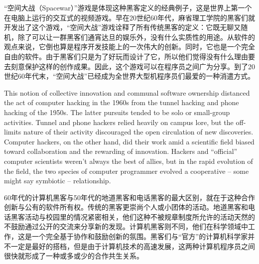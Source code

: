 \ifdefined\chs
“空间大战（Spacewar）”游戏是体现这种黑客定义的经典例子，这是世界上第一个在电脑上运行的交互式的视频游戏。早在20世纪60年代，麻省理工学院的黑客们就开发出了这个游戏，“空间大战”游戏诠释了所有传统黑客的定义：它既无聊又随机，除了可以让一群黑客们通宵达旦的娱乐外，没有什么实质性的用途。从软件的观点来说，它倒也算是程序开发技能上的一次伟大的创新。同时，它也是一个完全自由的软件。由于黑客们只是为了好玩而设计了它，所以他们觉得没有什么理由要去刻意保护这样的创作成果。因此，这个游戏可以在程序员之间广为分享。到了20世纪60年代末，“空间大战”已经成为全世界大型机程序员们最爱的一种消遣方式。
\fi

\ifdefined\eng
This notion of collective innovation and communal software ownership distanced the act of computer hacking in the 1960s from the tunnel hacking and phone hacking of the 1950s. The latter pursuits tended to be solo or small-group activities. Tunnel and phone hackers relied heavily on campus lore, but the off-limits nature of their activity discouraged the open circulation of new discoveries. Computer hackers, on the other hand, did their work amid a scientific field biased toward collaboration and the rewarding of innovation. Hackers and ``official'' computer scientists weren't always the best of allies, but in the rapid evolution of the field, the two species of computer programmer evolved a cooperative -- some might say symbiotic -- relationship.
\fi

\ifdefined\chs
60年代的计算机黑客与50年代的地道黑客和电话黑客的最大区别，就在于这种合作创新与公有的软件所有权。传统的黑客更崇尚个人或小团体的活动。地道黑客和电话黑客活动与校园里的情况紧密相关，他们这种不被规章制度所允许的活动天然的不鼓励通过公开的交流来分享新的发现。计算机黑客则不同，他们在科学领域中工作，这是一个完全基于协作和鼓励创新的氛围。黑客们与“官方”的计算机科学家并不一定是最好的搭档，但是由于计算机技术的高速发展，这两种计算机程序员之间很快就形成了一种或多或少的合作共生关系。
\fi


